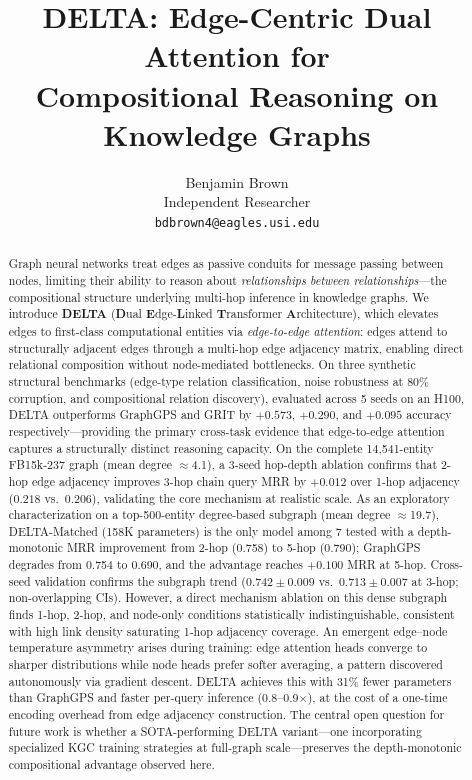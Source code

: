 \documentclass{article}
\title{DELTA: Edge-Centric Dual Attention for\\Compositional Reasoning on Knowledge Graphs}
\author{
  Benjamin Brown \\
  Independent Researcher \\
  \texttt{bdbrown4@eagles.usi.edu} \\
}
\begin{document}
\maketitle

\begin{abstract}
Graph neural networks treat edges as passive conduits for message passing between nodes, limiting their ability to reason about \emph{relationships between relationships}---the compositional structure underlying multi-hop inference in knowledge graphs. We introduce \textbf{DELTA} (\textbf{D}ual \textbf{E}dge-\textbf{L}inked \textbf{T}ransformer \textbf{A}rchitecture), which elevates edges to first-class computational entities via \emph{edge-to-edge attention}: edges attend to structurally adjacent edges through a multi-hop edge adjacency matrix, enabling direct relational composition without node-mediated bottlenecks. On three synthetic structural benchmarks (edge-type relation classification, noise robustness at 80\% corruption, and compositional relation discovery), evaluated across 5 seeds on an H100, DELTA outperforms GraphGPS and GRIT by $+0.573$, $+0.290$, and $+0.095$ accuracy respectively---providing the primary cross-task evidence that edge-to-edge attention captures a structurally distinct reasoning capacity. On the complete 14,541-entity FB15k-237 graph (mean degree $\approx$4.1), a 3-seed hop-depth ablation confirms that 2-hop edge adjacency improves 3-hop chain query MRR by $+0.012$ over 1-hop adjacency ($0.218$ vs.\ $0.206$), validating the core mechanism at realistic scale. As an exploratory characterization on a top-500-entity degree-based subgraph (mean degree $\approx$19.7), DELTA-Matched (158K parameters) is the only model among 7 tested with a depth-monotonic MRR improvement from 2-hop (0.758) to 5-hop (0.790); GraphGPS degrades from 0.754 to 0.690, and the advantage reaches $+0.100$ MRR at 5-hop. Cross-seed validation confirms the subgraph trend ($0.742 \pm 0.009$ vs.\ $0.713 \pm 0.007$ at 3-hop; non-overlapping CIs). However, a direct mechanism ablation on this dense subgraph finds 1-hop, 2-hop, and node-only conditions statistically indistinguishable, consistent with high link density saturating 1-hop adjacency coverage. An emergent edge--node temperature asymmetry arises during training: edge attention heads converge to sharper distributions while node heads prefer softer averaging, a pattern discovered autonomously via gradient descent. DELTA achieves this with 31\% fewer parameters than GraphGPS and faster per-query inference (0.8--0.9$\times$), at the cost of a one-time encoding overhead from edge adjacency construction. The central open question for future work is whether a SOTA-performing DELTA variant---one incorporating specialized KGC training strategies at full-graph scale---preserves the depth-monotonic compositional advantage observed here.
\end{abstract}
\end{document}
